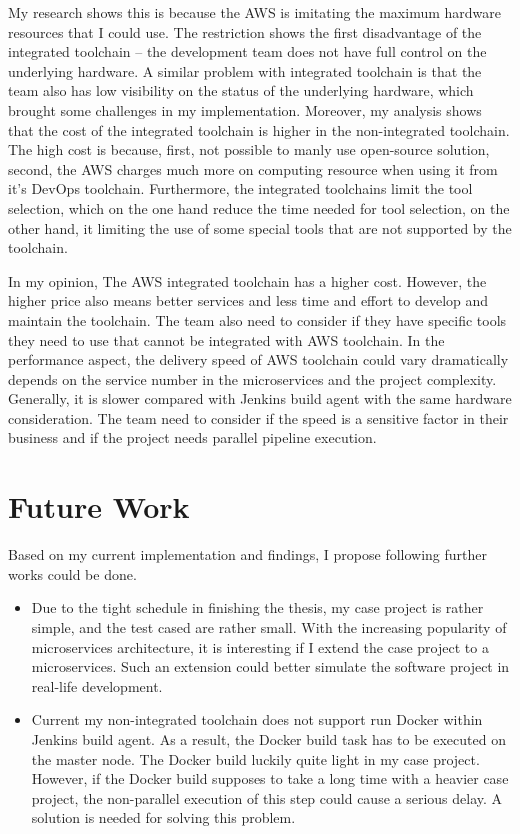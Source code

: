 My research shows this is because the AWS is imitating the maximum hardware resources that I could use. The restriction shows the first disadvantage of the integrated toolchain -- the development team does not have full control on the underlying hardware. A similar problem with integrated toolchain is that the team also has low visibility on the status of the underlying hardware, which brought some challenges in my implementation. Moreover, my analysis shows that the cost of the integrated toolchain is higher in the non-integrated toolchain. The high cost is because, first, not possible to manly use open-source solution, second, the AWS charges much more on computing resource when using it from it's DevOps toolchain.
Furthermore, the integrated toolchains limit the tool selection, which on the one hand reduce the time needed for tool selection, on the other hand, it limiting the use of some special tools that are not supported by the toolchain.
\par
In my opinion, The AWS integrated toolchain has a higher cost. However, the higher price also means better services and less time and effort to develop and maintain the toolchain. The team also need to consider if they have specific tools they need to use that cannot be integrated with AWS toolchain. In the performance aspect, the delivery speed of AWS toolchain could vary dramatically depends on the service number in the microservices and the project complexity. Generally, it is slower compared with Jenkins build agent with the same hardware consideration. The team need to consider if the speed is a sensitive factor in their business and if the project needs parallel pipeline execution.
\section{Future Work}
Based on my current implementation and findings, I propose following further works could be done.
\begin{itemize}
    \item Due to the tight schedule in finishing the thesis, my case project is rather simple, and the test cased are rather small.  With the increasing popularity of microservices architecture, it is interesting if I extend the case project to a microservices. Such an extension could better simulate the software project in real-life development.
    \item Current my non-integrated toolchain does not support run Docker within Jenkins build agent. As a result, the Docker build task has to be executed on the master node. The Docker build luckily quite light in my case project. However, if the Docker build supposes to take a long time with a heavier case project, the non-parallel execution of this step could cause a serious delay. A solution is needed for solving this problem.
\end{itemize}


